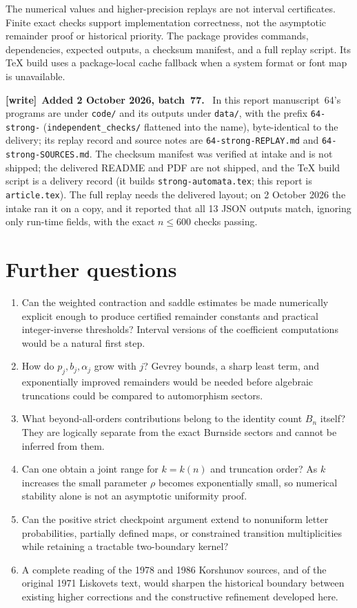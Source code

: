 \documentclass[11pt,letterpaper]{article}
\theoremstyle{remark}\newtheorem{remark}[theorem]{Remark}
\numberwithin{equation}{section}
\newenvironment{writenote}[1][]{\par\smallskip\begingroup\small
 \noindent\textbf{[write]}\if\relax\detokenize{#1}\relax\else~\textbf{#1.}\fi\ }%
 {\par\endgroup\smallskip}
\begin{document}
The numerical values and higher-precision replays are not interval certificates. Finite exact checks support implementation correctness, not the asymptotic remainder proof or historical priority. The package provides commands, dependencies, expected outputs, a checksum manifest, and a full replay script. Its TeX build uses a package-local cache fallback when a system format or font map is unavailable.
\begin{writenote}[Added 2 October 2026, batch~77]
In this report manuscript~64's programs are under \texttt{code/} and its
outputs under \texttt{data/}, with the prefix \texttt{64-strong-}
(\texttt{independent\_checks/} flattened into the name), byte-identical to
the delivery; its replay record and source notes are
\texttt{64-strong-REPLAY.md} and \texttt{64-strong-SOURCES.md}. The checksum
manifest was verified at intake and is not shipped; the delivered README and
PDF are not shipped, and the TeX build script is a delivery record (it
builds \texttt{strong-automata.tex}; this report is \texttt{article.tex}).
The full replay needs the delivered layout; on 2 October 2026 the intake ran
it on a copy, and it reported that all 13 JSON outputs match, ignoring only
run-time fields, with the exact $n\le600$ checks passing.
\end{writenote}

\section{Further questions}\label{asa:str:sec:further}
\begin{enumerate}
\item Can the weighted contraction and saddle estimates be made numerically explicit enough to produce certified remainder constants and practical integer-inverse thresholds? Interval versions of the coefficient computations would be a natural first step.
\item How do $p_j,b_j,\alpha_j$ grow with $j$? Gevrey bounds, a sharp least term, and exponentially improved remainders would be needed before algebraic truncations could be compared to automorphism sectors.
\item What beyond-all-orders contributions belong to the identity count $B_n$ itself? They are logically separate from the exact Burnside sectors and cannot be inferred from them.
\item Can one obtain a joint range for $k=k(n)$ and truncation order? As $k$ increases the small parameter $\rho$ becomes exponentially small, so numerical stability alone is not an asymptotic uniformity proof.
\item Can the positive strict checkpoint argument extend to nonuniform letter probabilities, partially defined maps, or constrained transition multiplicities while retaining a tractable two-boundary kernel?
\item A complete reading of the 1978 and 1986 Korshunov sources, and of the original 1971 Liskovets text, would sharpen the historical boundary between existing higher corrections and the constructive refinement developed here.
\end{enumerate}
\end{document}
